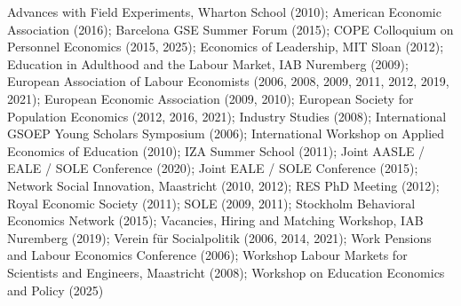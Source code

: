Advances with Field Experiments, Wharton School (2010); American Economic Association (2016); Barcelona GSE Summer Forum (2015); COPE Colloquium on Personnel Economics (2015, 2025); Economics of Leadership, MIT Sloan (2012); Education in Adulthood and the Labour Market, IAB Nuremberg (2009); European Association of Labour Economists (2006, 2008, 2009, 2011, 2012, 2019, 2021); European Economic Association (2009, 2010); European Society for Population Economics (2012, 2016, 2021); Industry Studies (2008); International GSOEP Young Scholars Symposium (2006); International Workshop on Applied Economics of Education (2010); IZA Summer School (2011); Joint AASLE / EALE / SOLE Conference (2020); Joint EALE / SOLE Conference (2015); Network Social Innovation, Maastricht (2010, 2012); RES PhD Meeting (2012); Royal Economic Society (2011); SOLE (2009, 2011); Stockholm Behavioral Economics Network (2015); Vacancies, Hiring and Matching Workshop, IAB Nuremberg (2019); Verein für Socialpolitik (2006, 2014, 2021); Work Pensions and Labour Economics Conference (2006); Workshop Labour Markets for Scientists and Engineers, Maastricht (2008); Workshop on Education Economics and Policy (2025)%
